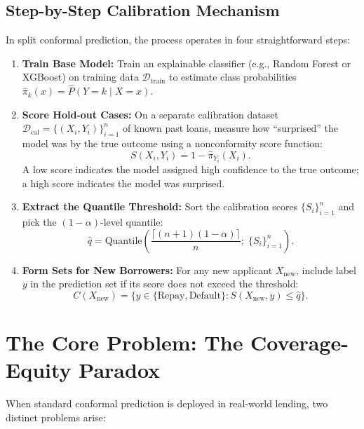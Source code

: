 \documentclass[11pt,a4paper]{article}
\begin{document}
\subsection{Step-by-Step Calibration Mechanism}
In split conformal prediction, the process operates in four straightforward steps:
\begin{enumerate}[leftmargin=1.5em, itemsep=3pt]
    \item \textbf{Train Base Model:} Train an explainable classifier (e.g., Random Forest or XGBoost) on training data $\mathcal{D}_{\text{train}}$ to estimate class probabilities $\hat{\pi}_k(x) = \hat{P}(Y=k \mid X=x)$.
    \item \textbf{Score Hold-out Cases:} On a separate calibration dataset $\mathcal{D}_{\text{cal}} = \{(X_i, Y_i)\}_{i=1}^n$ of known past loans, measure how ``surprised'' the model was by the true outcome using a nonconformity score function:
    \begin{equation}
    S(X_i, Y_i) = 1 - \hat{\pi}_{Y_i}(X_i).
    \end{equation}
    A low score indicates the model assigned high confidence to the true outcome; a high score indicates the model was surprised.
    \item \textbf{Extract the Quantile Threshold:} Sort the calibration scores $\{S_i\}_{i=1}^n$ and pick the $(1 - \alpha)$-level quantile:
    \begin{equation}
    \hat{q} = \text{Quantile}\left(\frac{\lceil(n+1)(1-\alpha)\rceil}{n};\; \{S_i\}_{i=1}^n\right).
    \end{equation}
    \item \textbf{Form Sets for New Borrowers:} For any new applicant $X_{\text{new}}$, include label $y$ in the prediction set if its score does not exceed the threshold:
    \begin{equation}
    C(X_{\text{new}}) = \bigl\{y \in \{\text{Repay}, \text{Default}\} : S(X_{\text{new}}, y) \le \hat{q}\bigr\}.
    \end{equation}
\end{enumerate}

\section{The Core Problem: The Coverage-Equity Paradox}

When standard conformal prediction is deployed in real-world lending, two distinct problems arise:
\end{document}
